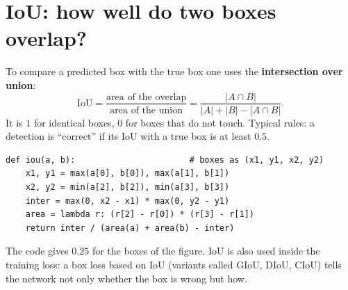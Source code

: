 \section*{IoU: how well do two boxes overlap?}
To compare a predicted box with the true box one uses the \textbf{intersection over union}:
\[
\mathrm{IoU}=\frac{\text{area of the overlap}}{\text{area of the union}}=\frac{|A\cap B|}{|A|+|B|-|A\cap B|}.
\]
It is $1$ for identical boxes, $0$ for boxes that do not touch. Typical rules: a detection is ``correct'' if its IoU with a true box is at least $0.5$.
\begin{center}
\end{center}
\begin{verbatim}
def iou(a, b):                       # boxes as (x1, y1, x2, y2)
    x1, y1 = max(a[0], b[0]), max(a[1], b[1])
    x2, y2 = min(a[2], b[2]), min(a[3], b[3])
    inter = max(0, x2 - x1) * max(0, y2 - y1)
    area = lambda r: (r[2] - r[0]) * (r[3] - r[1])
    return inter / (area(a) + area(b) - inter)
\end{verbatim}
The code gives $0.25$ for the boxes of the figure. IoU is also used inside the training loss: a box loss based on IoU (variants called GIoU, DIoU, CIoU) tells the network not only whether the box is wrong but how.

